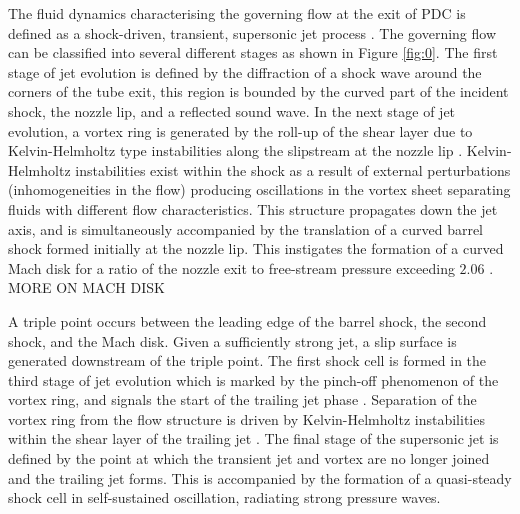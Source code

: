 The fluid dynamics characterising the governing flow at the exit of PDC is defined as a shock-driven, transient, supersonic jet process \cite{radulescu2007transient}. The governing flow can be classified into several different stages \cite{ishii1999experimental} as shown in Figure \ref{fig:0}. The first stage of jet evolution is defined by the diffraction of a shock wave around the corners of the tube exit, this region is bounded by the curved part of the incident shock, the nozzle lip, and a reflected sound wave. 
In the next stage of jet evolution, a vortex ring is generated by the roll-up of the shear layer due to Kelvin-Helmholtz type instabilities along the slipstream at the nozzle lip \cite{elder1952experimental,dora2014role}. Kelvin-Helmholtz instabilities exist within the shock as a result of external perturbations (inhomogeneities in the flow) producing oscillations in the vortex sheet separating fluids with different flow characteristics. This structure propagates down the jet axis, and is simultaneously accompanied by the translation of a curved barrel shock formed initially at the nozzle lip. This instigates the formation of a curved Mach disk for a ratio of the nozzle exit to free-stream pressure exceeding $2.06$ \cite{matsuda1987numerical}. MORE ON MACH DISK

A triple point occurs between the leading edge of the barrel shock, the second shock, and the Mach disk. Given a sufficiently strong jet, a slip surface is generated downstream of the triple point. The first shock cell is formed in the third stage of jet evolution which is marked by the pinch-off phenomenon of the vortex ring, and signals the start of the trailing jet phase \cite{gharib1998universal}. Separation of the vortex ring from the flow structure is driven by Kelvin-Helmholtz instabilities within the shear layer of the trailing jet \cite{zhao2000effects}. The final stage of the supersonic jet is defined by the point at which the transient jet and vortex are no longer joined and the trailing jet forms. This is accompanied by the formation of a quasi-steady shock cell in self-sustained oscillation, radiating strong pressure waves. %

